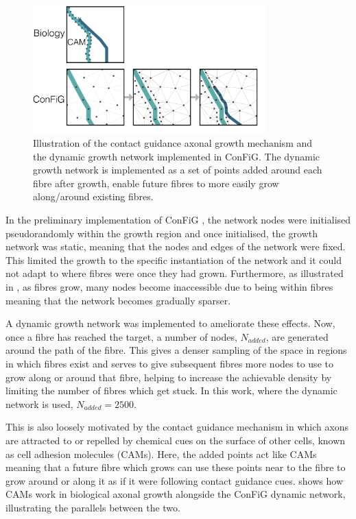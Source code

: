 \begin{figure}
  \centering
  \includegraphics[width=0.8\textwidth]{figures/config/biological_cam.png}
  \caption[Illustration of the contact guidance mechanism]{Illustration of the contact guidance axonal growth mechanism and the dynamic growth network implemented in ConFiG. The dynamic growth network is implemented as a set of points added around each fibre after growth, enable future fibres to more easily grow along/around existing fibres.}
  \label{fig:config_dynam_growth}
\end{figure}

In the preliminary implementation of ConFiG \cite{Callaghan2019}, the network nodes were initialised pseudorandomly within the growth region and once initialised, the growth network was static, meaning that the nodes and edges of the network were fixed. This limited the growth to the specific instantiation of the network and it could not adapt to where fibres were once they had grown. Furthermore, as illustrated in , as fibres grow, many nodes become inaccessible due to being within fibres meaning that the network becomes gradually sparser.

A dynamic growth network was implemented to ameliorate these effects. Now, once a fibre has reached the target, a number of nodes, $N_{added}$, are generated around the path of the fibre. This gives a denser sampling of the space in regions in which fibres exist and serves to give subsequent fibres more nodes to use to grow along or around that fibre, helping to increase the achievable density by limiting the number of fibres which get stuck. In this work, where the dynamic network is used, $N_{added}=2500$.

This is also loosely motivated by the contact guidance mechanism in which axons are attracted to or repelled by chemical cues on the surface of other cells, known as cell adhesion molecules (CAMs). Here, the added points act like CAMs meaning that a future fibre which grows can use these points near to the fibre to grow around or along it as if it were following contact guidance cues.  shows how CAMs work in biological axonal growth alongside the ConFiG dynamic network, illustrating the parallels between the two.

